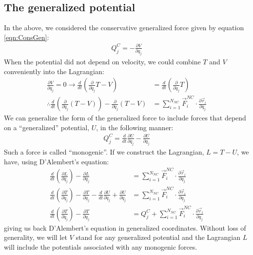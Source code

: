 \subsection{The generalized potential}
In the above, we considered the conservative generalized force given by equation \ref{eqn:ConsGen}:
\begin{align*}
Q_j^C=-\frac{\partial V}{\partial q_j}
\end{align*}
When the potential did not depend on velocity, we could combine $T$ and $V$ conveniently into the Lagrangian:
\begin{align*}
\frac{\partial V}{\partial \dot{q}_j}=0 \to \frac{d}{dt}\left(\frac{\partial }{\partial \dot{q}_j} T-V \right) &=\frac{d}{dt}\left(\frac{\partial }{\partial \dot{q}_j} T \right)\nonumber\\
\therefore \frac{d}{dt}\left(\frac{\partial }{\partial \dot{q}_j} (T-V) \right) - \frac{\partial }{\partial q_j}(T-V)&=\sum_{i=1}^{N_{NC}}\vec{F}_i^{NC}\cdot\frac{\partial\vec{r}_i}{\partial q_j}
\end{align*} 
We can generalize the form of the generalized force to include forces that depend on a ``generalized'' potential, $U$, in the following manner:
\begin{align*}
Q_j^C=\frac{d}{dt}\frac{\partial U}{\partial \dot{q}_j}-\frac{\partial U}{\partial q_j}
\end{align*}
Such a force is called ``monogenic''. If we construct the Lagrangian, $L=T-U$, we have, using D'Alembert's equation:
\begin{align*}
\frac{d}{dt}\left(\frac{\partial L}{\partial \dot{q}_j} \right) - \frac{\partial L}{\partial q_j}&=\sum_{i=1}^{N_{NC}}\vec{F}_i^{NC}\cdot\frac{\partial\vec{r}_i}{\partial q_j}\nonumber\\
\frac{d}{dt}\left(\frac{\partial T}{\partial \dot{q}_j} \right) - \frac{\partial T}{\partial q_j}-\frac{d}{dt}\frac{\partial U}{\partial \dot{q}_j}+\frac{\partial U}{\partial q_j}&=\sum_{i=1}^{N_{NC}}\vec{F}_i^{NC}\cdot\frac{\partial\vec{r}_i}{\partial q_j}\nonumber\\
\frac{d}{dt}\left(\frac{\partial T}{\partial \dot{q}_j} \right) - \frac{\partial T}{\partial q_j}&=Q_j^C+\sum_{i=1}^{N_{NC}}\vec{F}_i^{NC}\cdot\frac{\partial\vec{r}_i}{\partial q_j}
\end{align*}
giving us back D'Alembert's equation in generalized coordinates. Without loss of generality, we will let $V$ stand for any generalized potential and the Lagrangian $L$ will include the potentials associated with any monogenic forces. 

